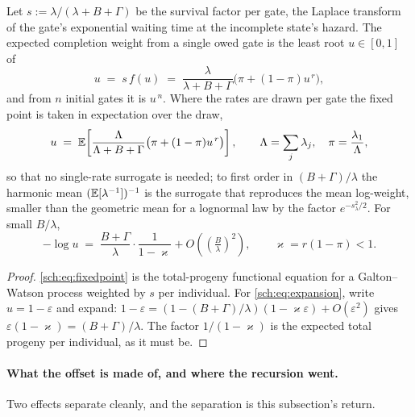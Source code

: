 \begin{proposition}\label{sch:prop:fixedpoint}
Let $s:=\lambda/(\lambda+B+\Gamma)$ be the survival factor per gate, the
Laplace transform of the gate's exponential waiting time at the
incomplete state's hazard. The expected completion weight from a single
owed gate is the least root $u\in[0,1]$ of
\begin{equation}\label{sch:eq:fixedpoint}
u\;=\;s\,f(u)\;=\;\frac{\lambda}{\lambda+B+\Gamma}\bigl(\pi+(1-\pi)u^{\,r}\bigr),
\end{equation}
and from $n$ initial gates it is $u^{\,n}$. Where the rates are drawn
per gate the fixed point is taken in expectation over the draw,
\begin{equation}\label{sch:eq:fixedpointrandom}
u\;=\;\mathbb{E}\!\left[\frac{\Lambda}{\Lambda+B+\Gamma}\bigl(\pi+(1-\pi)u^{\,r}\bigr)\right],
\qquad\Lambda=\sum_j\lambda_j,\quad\pi=\frac{\lambda_1}{\Lambda},
\end{equation}
so that no single-rate surrogate is needed; to first order in
$(B+\Gamma)/\lambda$ the harmonic mean $(\mathbb{E}[\lambda^{-1}])^{-1}$ is the
surrogate that reproduces the mean log-weight, smaller than the
geometric mean for a lognormal law by the factor $e^{-s_\lambda^2/2}$. For small $B/\lambda$,
\begin{equation}\label{sch:eq:expansion}
-\log u\;=\;\frac{B+\Gamma}{\lambda}\cdot\frac{1}{1-\varkappa}
+O\!\left(\left(\tfrac{B}{\lambda}\right)^{2}\right),
\qquad \varkappa=r(1-\pi)<1 .
\end{equation}
\end{proposition}

\begin{proof}
\eqref{sch:eq:fixedpoint} is the total-progeny functional equation for a
Galton--Watson process weighted by $s$ per individual. For
\eqref{sch:eq:expansion}, write $u=1-\varepsilon$ and expand:
$1-\varepsilon=(1-(B+\Gamma)/\lambda)(1-\varkappa\varepsilon)+O(\varepsilon^{2})$
gives $\varepsilon(1-\varkappa)=(B+\Gamma)/\lambda$. The factor $1/(1-\varkappa)$ is the expected total
progeny per individual, as it must be.
\end{proof}

\paragraph{What the offset is made of, and where the recursion
went.}\label{sch:rem:cefff}
Two effects separate cleanly, and the separation is this subsection's
return.

